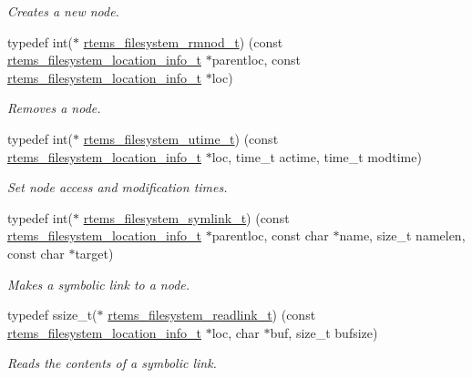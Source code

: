 \begin{DoxyCompactItemize}
\begin{DoxyCompactList}\small\item\em Creates a new node. \end{DoxyCompactList}\item 
typedef int($\ast$ \mbox{\hyperlink{group__LibIOFSOps_ga59f7a2562e7acba10bae871649c5d0f3}{rtems\+\_\+filesystem\+\_\+rmnod\+\_\+t}}) (const \mbox{\hyperlink{group__LibIO_ga3252b3d31ee3c49ffff0b7604a676864}{rtems\+\_\+filesystem\+\_\+location\+\_\+info\+\_\+t}} $\ast$parentloc, const \mbox{\hyperlink{group__LibIO_ga3252b3d31ee3c49ffff0b7604a676864}{rtems\+\_\+filesystem\+\_\+location\+\_\+info\+\_\+t}} $\ast$loc)
\begin{DoxyCompactList}\small\item\em Removes a node. \end{DoxyCompactList}\item 
typedef int($\ast$ \mbox{\hyperlink{group__LibIOFSOps_ga7b4bd5a75a776c42f1e09159406e2c94}{rtems\+\_\+filesystem\+\_\+utime\+\_\+t}}) (const \mbox{\hyperlink{group__LibIO_ga3252b3d31ee3c49ffff0b7604a676864}{rtems\+\_\+filesystem\+\_\+location\+\_\+info\+\_\+t}} $\ast$loc, time\+\_\+t actime, time\+\_\+t modtime)
\begin{DoxyCompactList}\small\item\em Set node access and modification times. \end{DoxyCompactList}\item 
typedef int($\ast$ \mbox{\hyperlink{group__LibIOFSOps_gaf21fe2af848bab4061fd62dd0f60522f}{rtems\+\_\+filesystem\+\_\+symlink\+\_\+t}}) (const \mbox{\hyperlink{group__LibIO_ga3252b3d31ee3c49ffff0b7604a676864}{rtems\+\_\+filesystem\+\_\+location\+\_\+info\+\_\+t}} $\ast$parentloc, const char $\ast$name, size\+\_\+t namelen, const char $\ast$target)
\begin{DoxyCompactList}\small\item\em Makes a symbolic link to a node. \end{DoxyCompactList}\item 
typedef ssize\+\_\+t($\ast$ \mbox{\hyperlink{group__LibIOFSOps_ga811a6b3bc7b01155f7b585a8eae29177}{rtems\+\_\+filesystem\+\_\+readlink\+\_\+t}}) (const \mbox{\hyperlink{group__LibIO_ga3252b3d31ee3c49ffff0b7604a676864}{rtems\+\_\+filesystem\+\_\+location\+\_\+info\+\_\+t}} $\ast$loc, char $\ast$buf, size\+\_\+t bufsize)
\begin{DoxyCompactList}\small\item\em Reads the contents of a symbolic link. \end{DoxyCompactList}\item 

\end{DoxyCompactItemize}

